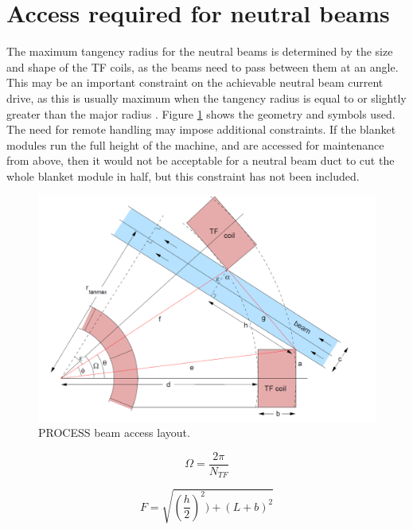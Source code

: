 \documentclass[hidelinks]{article}
\numberwithin{equation}{section}
\begin{document}
    \section{Access required for neutral beams}

    The maximum tangency radius for the neutral beams is determined by the size and 
    shape of the TF coils, as the beams need to pass between them at an angle. This 
    may be an important constraint on the achievable neutral beam current drive, as 
    this is usually maximum when the tangency radius is equal to or slightly greater 
    than the major radius \cite{kovari2014, Surrey2012}.  Figure \ref{fig: beam-access} 
    shows the geometry and symbols used.  The need for remote handling may impose 
    additional constraints.  If the blanket modules run the full height of the machine, 
    and are accessed for maintenance from above, then it would not be acceptable for a 
    neutral beam duct to cut the whole blanket module in half, but this constraint has 
    not been included.

    \begin{figure}[!t]
    \centering
    \includegraphics[scale=0.4]{figures/beam_access.png}
    \caption{PROCESS beam access layout.} \label{fig: beam-access}
    \end{figure}

    \begin{equation}\label{eq: beam-a-omega}
        \Omega = \frac{2\pi}{N_{TF}}
    \end{equation}

    \begin{equation}\label{eq: beam-a-f}
        F = \sqrt{(\frac{h}{2})^2) + (L + b)^2 }
    \end{equation}
\end{document}
